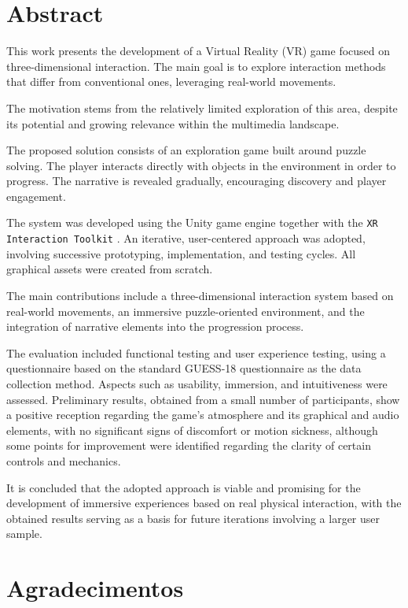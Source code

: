 \documentclass[a4paper, 12pt]{book}
\begin{document}
\chapter{Abstract}\label{ch:abstract}
This work presents the development of a Virtual Reality (VR) game focused
on three-dimensional interaction. The main goal is to explore interaction
methods that differ from conventional ones, leveraging real-world
movements.

The motivation stems from the relatively limited exploration of this area,
despite its potential and growing relevance within the multimedia
landscape.

The proposed solution consists of an exploration game built around puzzle
solving. The player interacts directly with objects in the environment
in order to progress. The narrative is revealed gradually, encouraging
discovery and player engagement.

The system was developed using the Unity game engine \cite{unity} together
with the \texttt{XR Interaction Toolkit} \cite{xri}. An iterative,
user-centered approach was adopted, involving successive prototyping,
implementation, and testing cycles. All graphical assets were created
from scratch.

The main contributions include a three-dimensional interaction system
based on real-world movements, an immersive puzzle-oriented environment,
and the integration of narrative elements into the progression process.

The evaluation included functional testing and user experience testing,
using a questionnaire based on the standard GUESS-18 questionnaire
\cite{guess18} as the data collection method. Aspects such as
usability, immersion, and intuitiveness were assessed. Preliminary
results, obtained from a small number of participants, show a positive
reception regarding the game's atmosphere and its graphical and audio
elements, with no significant signs of discomfort or motion sickness,
although some points for improvement were identified regarding the
clarity of certain controls and mechanics.

It is concluded that the adopted approach is viable and promising for
the development of immersive experiences based on real physical
interaction, with the obtained results serving as a basis for future
iterations involving a larger user sample.


\chapter{Agradecimentos}
\end{document}
